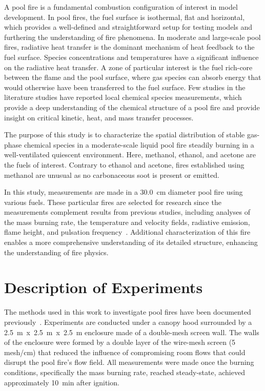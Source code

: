 \documentclass[12pt]{article}
\begin{document}
A pool fire is a fundamental combustion configuration of interest in model development. In pool fires, the fuel surface is isothermal, flat and horizontal, which provides a well-defined and straightforward setup for testing models and furthering the understanding of fire phenomena. In moderate and large-scale pool fires, radiative heat transfer is the dominant mechanism of heat feedback to the fuel surface. Species concentrations and temperatures have a significant influence on the radiative heat transfer. A zone of particular interest is the fuel rich-core between the flame and the pool surface, where gas species can absorb energy that would otherwise have been transferred to the fuel surface. Few studies in the literature studies have reported local chemical species measurements, which provide a deep understanding of the chemical structure of a pool fire and provide insight on critical kinetic, heat, and mass transfer processes.

The purpose of this study is to characterize the spatial distribution of stable gas-phase chemical species in a moderate-scale liquid pool fire steadily burning in a well-ventilated quiescent environment. Here, methanol, ethanol, and acetone are the fuels of interest. Contrary to ethanol and acetone, fires established using methanol are unusual as no carbonaceous soot is present or emitted.

In this study, measurements are made in a 30.0~\si{cm} diameter pool fire using various fuels. These particular fires are selected for research since the measurements complement results from previous studies, including analyses of the mass burning rate, the temperature and velocity fields, radiative emission, flame height, and pulsation frequency~\cite{Fisher1987,Hamins2016}. Additional characterization of this fire enables a more comprehensive understanding of its detailed structure, enhancing the understanding of fire physics.
\section{Description of Experiments}
\label{sec:Experiments}

The methods used in this work to investigate pool fires have been documented previously~\cite{Hamins2016,Hamins1994,Hamins1991,Hamins1996,Lock2008}. Experiments are conducted under a canopy hood surrounded by a 2.5~\si{m}~x~2.5~\si{m}~x~2.5~\si{m} enclosure made of a double-mesh screen wall. The walls of the enclosure were formed by a double layer of the wire-mesh screen (5 mesh/cm) that reduced the influence of compromising room flows that could disrupt the pool fire’s flow field. All measurements were made once the burning conditions, specifically the mass burning rate, reached steady-state, achieved approximately 10~\si{min} after ignition.
\end{document}
